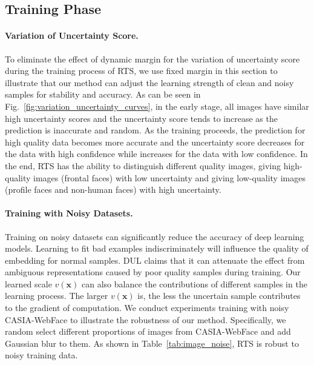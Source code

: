 \documentclass[letterpaper]{article} %
\begin{document}
\subsection{Training Phase}
\label{ssec:training phase}

\paragraph{Variation of Uncertainty Score.}
To eliminate the effect of dynamic margin for the variation of uncertainty score during the training process of RTS, we use fixed margin in this section to illustrate that our method can adjust the learning strength of clean and noisy samples for stability and accuracy.
As can be seen in Fig.~\ref{fig:variation_uncertainty_curves}, in the early stage, all images have similar high uncertainty scores and the uncertainty score tends to increase as the prediction is inaccurate and random. As the training proceeds, the prediction for high quality data becomes more accurate and the uncertainty score decreases for the data with high confidence while increases for the data with low confidence. In the end, RTS has the ability to distinguish different quality images, giving high-quality images (frontal faces) with low uncertainty and giving low-quality images (profile faces and non-human faces) with high uncertainty.

\paragraph{Training with Noisy Datasets.}
Training on noisy datasets can significantly reduce the accuracy of deep learning models. Learning to fit bad examples indiscriminately will influence the quality of embedding for normal samples.
%
DUL claims that it can attenuate the effect from ambiguous representations caused by poor quality samples during training. Our learned scale $v(\bm{x})$ can also balance the contributions of different samples in the learning process. The larger $v(\bm{x})$ is, the less the uncertain sample contributes to the gradient of computation. 
We conduct experiments training with noisy CASIA-WebFace to illustrate the robustness of our method. Specifically, we random select different proportions of images from CASIA-WebFace and add Gaussian blur to them. As shown in Table~\ref{tab:image_noise}, RTS is robust to noisy training data.
\end{document}
